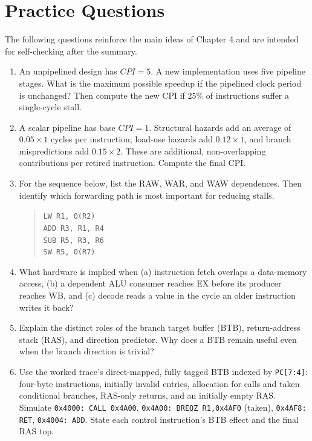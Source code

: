 \section{Practice Questions}\label{sec:ch4-practice}
The following questions reinforce the main ideas of Chapter 4 and are intended for self-checking after the summary.
\begin{enumerate}
    \item An unpipelined design has $CPI=5$.
    A new implementation uses five pipeline stages.
    What is the maximum possible speedup if the pipelined clock period is unchanged?
    Then compute the new CPI if 25\% of instructions suffer a single-cycle stall.
    \item A scalar pipeline has base $CPI=1$.
    Structural hazards add an average of $0.05\times 1$ cycles per instruction, load-use hazards add $0.12\times 1$, and branch mispredictions add $0.15\times 2$.
    These are additional, non-overlapping contributions per retired instruction.
    Compute the final CPI\@.
    \item For the sequence below, list the RAW, WAR, and WAW dependences.
    Then identify which forwarding path is most important for reducing stalls.
    \begin{quote}
        \texttt{LW R1, 0(R2)}\\
        \texttt{ADD R3, R1, R4}\\
        \texttt{SUB R5, R3, R6}\\
        \texttt{SW R5, 0(R7)}
    \end{quote}
    \item What hardware is implied when (a) instruction fetch overlaps a data-memory access, (b) a dependent ALU consumer reaches EX before its producer reaches WB, and (c) decode reads a value in the cycle an older instruction writes it back?
    \item Explain the distinct roles of the branch target buffer (BTB), return-address stack (RAS), and direction predictor.
    Why does a BTB remain useful even when the branch direction is trivial?
    \item Use the worked trace's direct-mapped, fully tagged BTB indexed by \texttt{PC[7:4]}: four-byte instructions, initially invalid entries, allocation for calls and taken conditional branches, RAS-only returns, and an initially empty RAS.
    Simulate \texttt{0x4000: CALL 0x4A00}, \texttt{0x4A00: BREQZ R1,0x4AF0} (taken), \texttt{0x4AF8: RET}, \texttt{0x4004: ADD}.
    State each control instruction's BTB effect and the final RAS top.

\end{enumerate}
